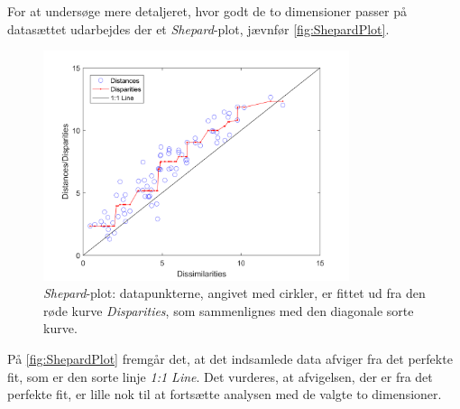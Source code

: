 For at undersøge mere detaljeret, hvor godt de to dimensioner passer på datasættet udarbejdes der et \textit{Shepard}-plot, jævnfør \autoref{fig:ShepardPlot}.
%
\begin{figure}[H]
\centering
\includegraphics[width = 0.8\textwidth]{Figure/Sheppard_plot.png} 
\caption{\textit{Shepard}-plot: datapunkterne, angivet med cirkler, er fittet ud fra den røde kurve \textit{Disparities}, som sammenlignes med den diagonale sorte kurve.}
\label{fig:ShepardPlot}
\end{figure}
\noindent
%
På \autoref{fig:ShepardPlot} fremgår det, at det indsamlede data afviger fra det perfekte fit, som er den sorte linje \textit{1:1 Line}. Det vurderes, at afvigelsen, der er fra det perfekte fit, er lille nok til at fortsætte analysen med de valgte to dimensioner. 
%
\vfill

